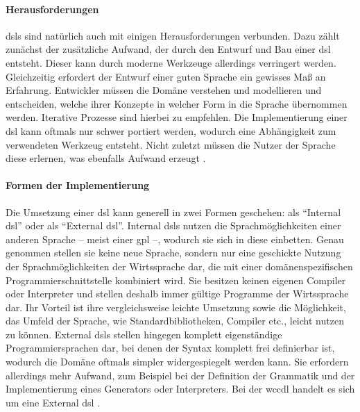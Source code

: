     \paragraph*{Herausforderungen}
    \glspl{dsl} sind natürlich auch mit einigen Herausforderungen verbunden.
    Dazu zählt zunächst der zusätzliche Aufwand, der durch den Entwurf und Bau einer \gls{dsl} entsteht.
    Dieser kann durch moderne Werkzeuge allerdings verringert werden.
    Gleichzeitig erfordert der Entwurf einer guten Sprache ein gewisses Maß an Erfahrung.
    Entwickler müssen die Domäne verstehen und modellieren und entscheiden,
    welche ihrer Konzepte in welcher Form in die Sprache übernommen werden.
    Iterative Prozesse sind hierbei zu empfehlen.
    Die Implementierung einer \gls{dsl} kann oftmals nur schwer portiert werden,
    wodurch eine Abhängigkeit zum verwendeten Werkzeug entsteht.
    Nicht zuletzt müssen die Nutzer der Sprache diese erlernen,
    was ebenfalls Aufwand erzeugt
    \cite[Kapitel 2.6]{voelter:DslEngineering}.

    \paragraph*{Formen der Implementierung}
    Die Umsetzung einer \gls{dsl} kann generell in zwei Formen geschehen:
    als "`Internal \gls{dsl}"' oder als "`External \gls{dsl}"'.
    Internal \glspl{dsl} nutzen die Sprachmöglichkeiten einer anderen Sprache
    -- meist einer \gls{gpl} --, wodurch sie sich in diese einbetten.
    Genau genommen stellen sie keine neue Sprache,
    sondern nur eine geschickte Nutzung der Sprachmöglichkeiten
    der Wirtssprache dar, die mit einer domänenspezifischen Programmierschnittstelle kombiniert wird.
    Sie besitzen keinen eigenen Compiler oder Interpreter und stellen deshalb immer gültige Programme
    der Wirtssprache dar.
    Ihr Vorteil ist ihre vergleichsweise leichte Umsetzung sowie die Möglichkeit, das Umfeld der Sprache,
    wie Standardbibliotheken, Compiler etc., leicht nutzen zu können.
    External \glspl{dsl} stellen hingegen komplett eigenständige Programmiersprachen dar,
    bei denen der Syntax komplett frei definierbar ist,
    wodurch die Domäne oftmals simpler widergespiegelt werden kann.
    Sie erfordern allerdings mehr Aufwand, zum Beispiel bei der Definition der Grammatik
    und der Implementierung eines Generators oder Interpreters.
    Bei der \gls{wccdl} handelt es sich um eine External \gls{dsl}
    \cite[Kapitel 2.8.1]{voelter:DslEngineering}.

